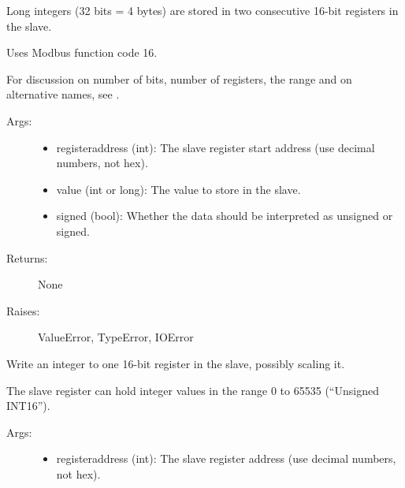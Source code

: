 \documentclass[letterpaper,10pt,english]{sphinxmanual}
\begin{document}
\begin{fulllineitems}
\begin{fulllineitems}
Long integers (32 bits = 4 bytes) are stored in two consecutive 16-bit registers in the slave.

Uses Modbus function code 16.

For discussion on number of bits, number of registers, the range
and on alternative names, see {\hyperref[minimalmodbus:minimalmodbus.Instrument.read_long]{}}.
\begin{description}
\item[{Args:}] \leavevmode\begin{itemize}
\item {} 
registeraddress (int): The slave register start address  (use decimal numbers, not hex).

\item {} 
value (int or long): The value to store in the slave.

\item {} 
signed (bool): Whether the data should be interpreted as unsigned or signed.

\end{itemize}

\item[{Returns:}] \leavevmode
None

\item[{Raises:}] \leavevmode
ValueError, TypeError, IOError

\end{description}

\end{fulllineitems}


\begin{fulllineitems}
\label{minimalmodbus:minimalmodbus.Instrument.write_register}
Write an integer to one 16-bit register in the slave, possibly scaling it.

The slave register can hold integer values in the range 0 to 65535 (``Unsigned INT16'').
\begin{description}
\item[{Args:}] \leavevmode\begin{itemize}
\item {} 
registeraddress (int): The slave register address  (use decimal numbers, not hex).


\end{itemize}
\end{description}
\end{fulllineitems}
\end{fulllineitems}
\end{document}
